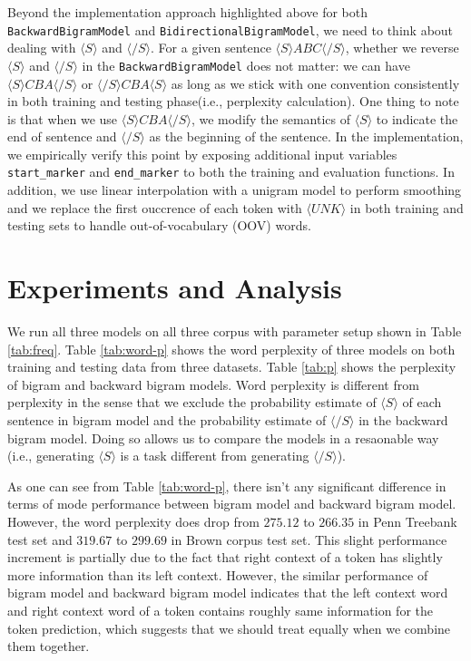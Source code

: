 \documentclass[11pt,a4paper]{article}
\begin{document}
Beyond the implementation approach highlighted above for both \texttt{BackwardBigramModel} and \texttt{BidirectionalBigramModel},
we need to think about dealing with $\langle S \rangle$ and $\langle /S \rangle$. For a given sentence 
$\langle S \rangle A B C \langle /S \rangle$, whether
we reverse $\langle S \rangle$ and $\langle /S \rangle$ in the \texttt{BackwardBigramModel} does not matter: we
can have $\langle S \rangle C B A \langle /S \rangle$ or $\langle /S \rangle C B A \langle S \rangle$ as long as we stick with
one convention consistently in both training and testing phase(i.e., perplexity calculation).
One thing to note is that when we use $\langle S \rangle C B A \langle /S \rangle$, we modify the semantics of $\langle S \rangle$
to indicate the end of sentence and $\langle /S \rangle$ as the beginning of the sentence. In the implementation,
we empirically verify this point by exposing additional input variables \texttt{start\_marker} and \texttt{end\_marker}
to both the training and evaluation functions. In addition, we use linear interpolation with a unigram model to perform smoothing and we replace
the first ouccrence of each token with $\langle UNK \rangle$ in both training and testing sets to handle out-of-vocabulary
(OOV) words.

\section{Experiments and Analysis}

We run all three models on all three corpus with parameter setup shown in Table \ref{tab:freq}.
Table \ref{tab:word-p} shows the word perplexity of three models on both training and testing data from
three datasets. Table \ref{tab:p} shows the perplexity of bigram and backward bigram models. Word perplexity
is different from perplexity in the sense that we exclude the probability estimate of $\langle S \rangle$
of each sentence in bigram model and the probability estimate of $\langle /S \rangle$ in the backward bigram
model. Doing so allows us to compare the models in a resaonable way (i.e., generating $\langle S \rangle$
is a task different from generating $\langle /S \rangle$).

As one can see from Table \ref{tab:word-p}, there isn't any significant difference in terms of mode performance
between bigram model and backward bigram model. However, the word perplexity does drop from
$275.12$ to $266.35$ in Penn Treebank test set and $319.67$ to $299.69$ in Brown corpus test set. This slight performance increment
is partially due to the fact that right context of a token has slightly more information than its left context. However,
the similar performance of bigram model and backward bigram model indicates that the left context word and right context
word of a token contains roughly same information for the token prediction, which suggests that we should treat 
equally when we combine them together.
\end{document}
